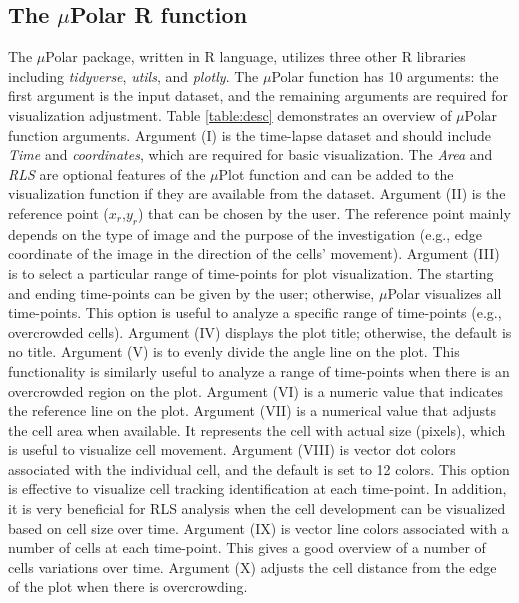 \documentclass[conference]{IEEEtran}
\begin{document}
 
 
\subsection{The $\mu$Polar R function}
The $\mu$Polar package, written in R language, utilizes three other R libraries including \textit{tidyverse}, \textit{utils}, and \textit{plotly}. The $\mu$Polar function has 10 arguments: the first argument is the input dataset, and the remaining arguments are required for visualization adjustment. Table \ref{table:desc} demonstrates an overview of $\mu$Polar function arguments. Argument (I) is the time-lapse dataset and should include \textit{Time} and \textit{coordinates}, which are required for basic visualization. The \textit{Area} and \textit{RLS} are optional features of the $\mu$Plot function and can be added to the visualization function if they are available from the dataset. Argument (II) is the reference point ($x_r$,$y_r$) that can be chosen by the user. The reference point mainly depends on the type of image and the purpose of the investigation (e.g., edge coordinate of the image in the direction of the cells'
movement). Argument (III) is to select a particular range of time-points for plot visualization. The starting and ending time-points can be given by the user; otherwise, $\mu$Polar visualizes all time-points. This option is useful to analyze a specific range of time-points (e.g., overcrowded cells). Argument (IV) displays the plot title; otherwise, the default is no title. Argument (V) is to evenly divide the angle line on the plot. This functionality is similarly useful to analyze a range of time-points when there is an overcrowded region on the plot. Argument (VI) is a numeric value that indicates the reference line on the plot. Argument (VII) is a numerical value that adjusts the cell area when available. It represents the cell with actual size (pixels), which is useful to visualize cell movement. Argument (VIII) is vector dot colors associated with the individual cell, and the default is set to 12 colors. This option is effective to visualize cell tracking identification at each time-point. In addition, it is very beneficial for RLS analysis when the cell development can be visualized based on cell size over time. Argument (IX) is vector line colors associated with a number of cells at each time-point. This gives a good overview of a number of cells variations over time. Argument (X) adjusts the cell distance from the edge of the plot when there is overcrowding. 
\end{document}
